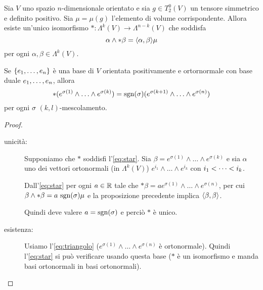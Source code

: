 \begin{proposition}
	Sia $V$ uno spazio $n$-dimensionale orientato e sia $g\in T^0_2(V)$ un tensore simmetrico e definito positivo.
	Sia $\mu=\mu(g)$ l'elemento di volume corrispondente.
	Allora esiste un'unico isomorfismo $*:\Lambda^k(V) \to \Lambda^{n-k}(V)$ che soddisfa
	\begin{equation} \label{eq:star}
	\alpha \wedge * \beta = \Scal \alpha\beta \mu
	\end{equation}
	per ogni $\alpha,\beta \in\Lambda^k(V)$.
	
	Se $\{\seqb en, \}$ è una base di $V$ orientata positivamente e ortornormale con base duale $\seqb en,$, allora
	\begin{equation}\label{eq:triangolo}
	*(e^{\sigma(1)}\wedge\ldots\wedge e^{\sigma(k)}) = \sgn(\sigma) (e^{\sigma(k+1)}\wedge\ldots\wedge e^{\sigma(n)})
	\end{equation}
	per ogni $\sigma$ $(k,l)$-mescolamento.
\end{proposition}
\begin{proof}
	\begin{description}
		\item [unicità:] Supponiamo che $*$ soddisfi l'\cref{eq:star}. Sia $\beta = e^{\sigma(1)} \wedge\ldots\wedge e^{\sigma(k)}$ e sia $\alpha$ uno dei vettori ortonormali (in $\Lambda^k(V)$) $e^{i_1}\wedge\ldots\wedge e^{i_k}$ con $\seqb ik<$.
		
		Dall'\cref{eq:star} per ogni $a\in\R$ tale che $*\beta = a e^{\sigma(1)} \wedge\ldots\wedge e^{\sigma(n)}$, per cui $\beta\wedge * \beta = a\ \sgn(\sigma) \mu$ e la proposizione precedente implica $\Scal \beta\beta$. %
		
		Quindi deve valere $a = \sgn(\sigma)$ e perciò $*$ è unico.
		
		\item [esistenza:] Usiamo l'\cref{eq:triangolo} ($e^{\sigma(1)}\wedge\ldots\wedge e^{\sigma(n)}$ è ortonormale). Quindi l'\cref{eq:star} si può verificare usando questa base ($*$ è un isomorfismo e manda basi ortonormali in basi ortonormali).
	\end{description}
\end{proof}

